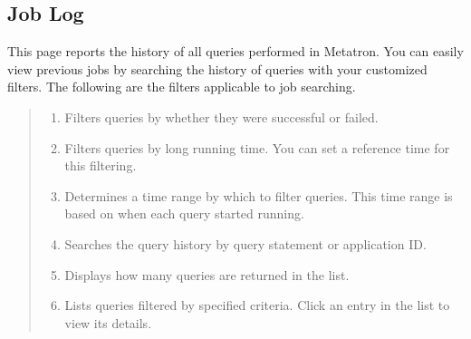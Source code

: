 \documentclass[letterpaper,10pt,english]{sphinxmanual}
\begin{document}
\subsection{Job Log}
\label{\detokenize{discovery/part02/data_monitoring:id3}}
This page reports the history of all queries performed in Metatron. You can easily view previous jobs by searching the history of queries with your customized filters. The following are the filters applicable to job searching.
\begin{quote}

\begin{figure}[H]
\centering

\noindent{}
\end{figure}
\begin{enumerate}
\def\theenumi{\arabic{enumi}}
\def\labelenumi{\theenumi .}
\makeatletter\def\p@enumii{\p@enumi \theenumi .}\makeatother
\item {} 
 Filters queries by whether they were successful or failed.

\item {} 
 Filters queries by long running time. You can set a reference time for this filtering.

\item {} 
 Determines a time range by which to filter queries. This time range is based on when each query started running.

\item {} 
 Searches the query history by query statement or application ID.

\item {} 
 Displays how many queries are returned in the list.

\item {} 
 Lists queries filtered by specified criteria. Click an entry in the list to view its details.

\end{enumerate}
\end{quote}
\end{document}

